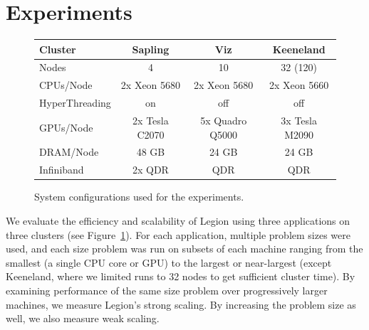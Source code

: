 \section{Experiments}
\label{sec:exp}



\begin{figure}
{\footnotesize
\begin{tabular}{l|ccc}
Cluster & Sapling & Viz & Keeneland \\
\midrule
Nodes   &   4     &  10 &  32 (120) \\
CPUs/Node & 2x Xeon 5680 & 2x Xeon 5680 & 2x Xeon 5660 \\
HyperThreading & on & off & off \\
GPUs/Node & 2x Tesla C2070 & 5x Quadro Q5000 & 3x Tesla M2090 \\
DRAM/Node & 48 GB & 24 GB & 24 GB \\
Infiniband & 2x QDR & QDR & QDR \\
\end{tabular}
}
\caption{System configurations used for the experiments. \label{fig:systems}}
\end{figure}

%
%
%  


We evaluate the efficiency and scalability of Legion using
three applications on three clusters (see Figure~\ref{fig:systems}).
For each application, multiple problem sizes were used, and each size problem was
run on subsets of each machine ranging from the smallest (a single CPU core or GPU)
to the largest or near-largest (except Keeneland, where we limited
runs to 32 nodes to get sufficient cluster time).
By examining performance of the same size problem over progressively larger
machines, we measure Legion's strong scaling.
By increasing the problem size as well, we also measure weak scaling.

